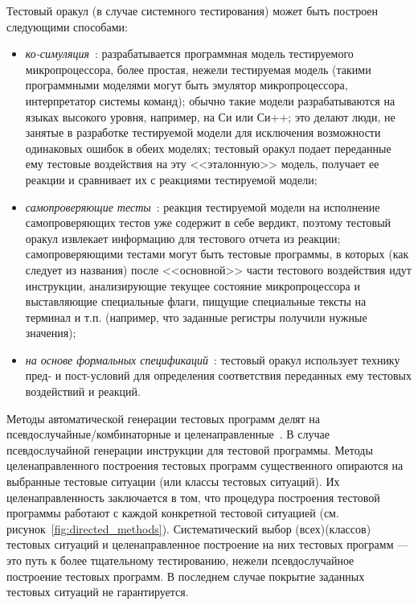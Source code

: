 Тестовый оракул (в случае системного тестирования) может быть построен следующими способами:
\begin{itemize}
  \item \emph{ко-симуляция}~\cite{HoPhD}: разрабатывается программная модель тестируемого микропроцессора, более простая, нежели тестируемая модель (такими программными моделями могут быть эмулятор микропроцессора, интерпретатор системы команд); обычно такие модели разрабатываются на языках высокого уровня, например, на Си или Си++; это делают люди, не занятые в разработке тестируемой модели для исключения возможности одинаковых ошибок в обеих моделях; тестовый оракул подает переданные ему тестовые воздействия на эту <<эталонную>> модель, получает ее реакции и сравнивает их с реакциями тестируемой модели;

  \item \emph{самопроверяющие тесты}~\cite{HoPhD}: реакция тестируемой модели на исполнение самопроверяющих тестов уже содержит в себе вердикт, поэтому тестовый оракул извлекает информацию для тестового отчета из реакции; самопроверяющими тестами могут быть тестовые программы, в которых (как следует из названия) после <<основной>> части тестового воздействия идут инструкции, анализирующие текущее состояние микропроцессора и выставляющие специальные флаги, пищущие специальные тексты на терминал и т.п. (например, что заданные регистры получили нужные значения);

  \item \emph{на основе формальных спецификаций}~\cite{KamkinThesis}: тестовый оракул использует технику пред- и пост-условий для определения соответствия переданных ему тестовых воздействий и реакций.
\end{itemize}

Методы автоматической генерации тестовых программ делят на псевдослучайные/комбинаторные и целенаправленные~\cite{HoPhD}. В случае псевдослучайной генерации инструкции для тестовой программы. Методы целенаправленного построения тестовых программ существенного опираются на выбранные тестовые ситуации (или классы тестовых ситуаций). Их целенаправленность заключается в том, что процедура построения тестовой программы работают с каждой конкретной тестовой ситуацией (см. рисунок~\ref{fig:directed_methods}). Систематический выбор (всех)(классов) тестовых ситуаций и целенаправленное построение на них тестовых программ --- это путь к более тщательному тестированию, нежели псевдослучайное построение тестовых программ. В последнем случае покрытие заданных тестовых ситуаций не гарантируется.

